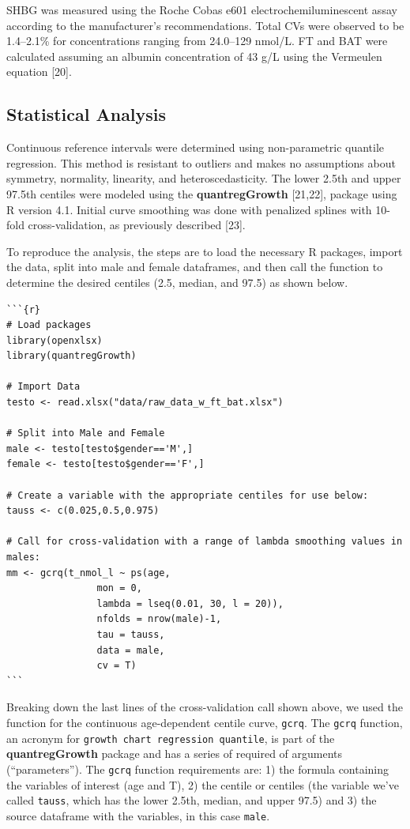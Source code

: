 \documentclass[]{elsarticle} %
\begin{document}
SHBG was measured using the Roche Cobas e601 electrochemiluminescent
assay according to the manufacturer's recommendations. Total CVs were
observed to be 1.4--2.1\% for concentrations ranging from 24.0--129
nmol/L. FT and BAT were calculated assuming an albumin concentration of
43 g/L using the Vermeulen equation {[}20{]}.

\hypertarget{statistical-analysis}{%
\subsection{Statistical Analysis}\label{statistical-analysis}}

Continuous reference intervals were determined using non-parametric
quantile regression. This method is resistant to outliers and makes no
assumptions about symmetry, normality, linearity, and
heteroscedasticity. The lower 2.5th and upper 97.5th centiles were
modeled using the \textbf{quantregGrowth} {[}21,22{]}, package using R
version 4.1. Initial curve smoothing was done with penalized splines
with 10-fold cross-validation, as previously described {[}23{]}.

To reproduce the analysis, the steps are to load the necessary R
packages, import the data, split into male and female dataframes, and
then call the function to determine the desired centiles (2.5, median,
and 97.5) as shown below.

\begin{verbatim}
```{r}
# Load packages
library(openxlsx)
library(quantregGrowth)

# Import Data
testo <- read.xlsx("data/raw_data_w_ft_bat.xlsx")

# Split into Male and Female 
male <- testo[testo$gender=='M',]
female <- testo[testo$gender=='F',]

# Create a variable with the appropriate centiles for use below: 
tauss <- c(0.025,0.5,0.975)

# Call for cross-validation with a range of lambda smoothing values in males:
mm <- gcrq(t_nmol_l ~ ps(age,
                mon = 0,
                lambda = lseq(0.01, 30, l = 20)),
                nfolds = nrow(male)-1,
                tau = tauss,
                data = male,
                cv = T)
```
\end{verbatim}

Breaking down the last lines of the cross-validation call shown above,
we used the function for the continuous age-dependent centile curve,
\texttt{gcrq}. The \texttt{gcrq} function, an acronym for
\texttt{growth\ chart\ regression\ quantile}, is part of the
\textbf{quantregGrowth} package and has a series of required of
arguments (``parameters''). The \texttt{gcrq} function requirements are:
1) the formula containing the variables of interest (age and T), 2) the
centile or centiles (the variable we've called \texttt{tauss}, which has
the lower 2.5th, median, and upper 97.5) and 3) the source dataframe
with the variables, in this case \texttt{male}.
\end{document}
